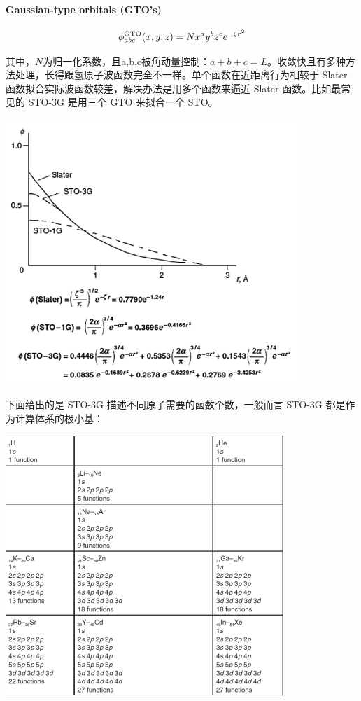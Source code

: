 \paragraph*{Gaussian-type orbitals (GTO's)}
\[\phi_{abc}^{\rm{GTO}}(x,y,z)=Nx^ay^bz^ce^{-\zeta r^2}\]

其中，$N$为归一化系数，且a,b,c被角动量控制：$a+b+c=L$。收敛快且有多种方法处理，长得跟氢原子波函数完全不一样。单个函数在近距离行为相较于 Slater 函数拟合实际波函数较差，解决办法是用多个函数来逼近 Slater 函数。比如最常见的 STO-3G 是用三个 GTO 来拟合一个 STO。

\begin{center}
    \includegraphics{fig/lzhx/微信图片_20211102165150}
\end{center}

下面给出的是 STO-3G 描述不同原子需要的函数个数，一般而言 STO-3G 都是作为计算体系的极小基：
\begin{center}
    \includegraphics[scale=0.7]{fig/lzhx/微信图片_20211102171332.png}
\end{center}

